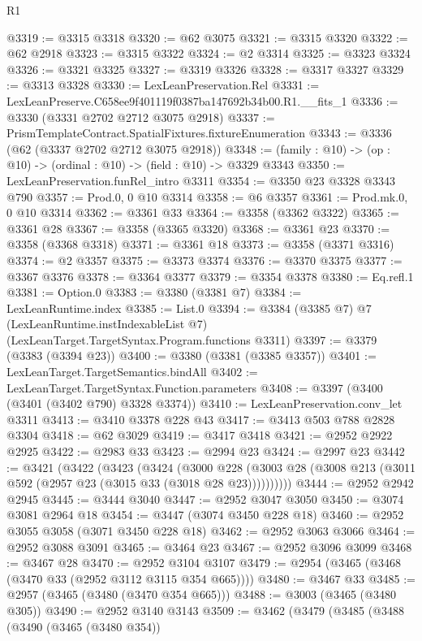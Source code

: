 \begin{lexlean}{R1}
\begin{coremodule}
@3319 := @3315 @3318
@3320 := @62 @3075
@3321 := @3315 @3320
@3322 := @62 @2918
@3323 := @3315 @3322
@3324 := @2 @3314
@3325 := @3323 @3324
@3326 := @3321 @3325
@3327 := @3319 @3326
@3328 := @3317 @3327
@3329 := @3313 @3328
@3330 := LexLeanPreservation.Rel
@3331 := LexLeanPreserve.C658ee9f401119f0387ba147692b34b00.R1.__fits_1
@3336 := @3330 (@3331 @2702 @2712 @3075 @2918)
@3337 := PrismTemplateContract.SpatialFixtures.fixtureEnumeration
@3343 := @3336 (@62 (@3337 @2702 @2712 @3075 @2918))
@3348 := (family : @10) -> (op : @10) -> (ordinal : @10) -> (field : @10) -> @3329 @3343
@3350 := LexLeanPreservation.funRel_intro @3311
@3354 := @3350 @23 @3328 @3343 @790
@3357 := Prod.{0, 0} @10 @3314
@3358 := @6 @3357
@3361 := Prod.mk.{0, 0} @10 @3314
@3362 := @3361 @33
@3364 := @3358 (@3362 @3322)
@3365 := @3361 @28
@3367 := @3358 (@3365 @3320)
@3368 := @3361 @23
@3370 := @3358 (@3368 @3318)
@3371 := @3361 @18
@3373 := @3358 (@3371 @3316)
@3374 := @2 @3357
@3375 := @3373 @3374
@3376 := @3370 @3375
@3377 := @3367 @3376
@3378 := @3364 @3377
@3379 := @3354 @3378
@3380 := Eq.refl.{1}
@3381 := Option.{0}
@3383 := @3380 (@3381 @7)
@3384 := LexLeanRuntime.index
@3385 := List.{0}
@3394 := @3384
    (@3385 @7)
    @7
    (LexLeanRuntime.instIndexableList @7)
    (LexLeanTarget.TargetSyntax.Program.functions @3311)
@3397 := @3379 (@3383 (@3394 @23))
@3400 := @3380 (@3381 (@3385 @3357))
@3401 := LexLeanTarget.TargetSemantics.bindAll
@3402 := LexLeanTarget.TargetSyntax.Function.parameters
@3408 := @3397 (@3400 (@3401 (@3402 @790) @3328 @3374))
@3410 := LexLeanPreservation.conv_let @3311
@3413 := @3410 @3378 @228 @43
@3417 := @3413 @503 @788 @2828 @3304
@3418 := @62 @3029
@3419 := @3417 @3418
@3421 := @2952 @2922 @2925
@3422 := @2983 @33
@3423 := @2994 @23
@3424 := @2997 @23
@3442 := @3421
    (@3422
      (@3423
        (@3424
          (@3000
            @228
            (@3003 @28 (@3008 @213 (@3011 @592 (@2957 @23 (@3015 @33 (@3018 @28 @23))))))))))
@3444 := @2952 @2942 @2945
@3445 := @3444 @3040
@3447 := @2952 @3047 @3050
@3450 := @3074 @3081 @2964 @18
@3454 := @3447 (@3074 @3450 @228 @18)
@3460 := @2952 @3055 @3058 (@3071 @3450 @228 @18)
@3462 := @2952 @3063 @3066
@3464 := @2952 @3088 @3091
@3465 := @3464 @23
@3467 := @2952 @3096 @3099
@3468 := @3467 @28
@3470 := @2952 @3104 @3107
@3479 := @2954 (@3465 (@3468 (@3470 @33 (@2952 @3112 @3115 @354 @665))))
@3480 := @3467 @33
@3485 := @2957 (@3465 (@3480 (@3470 @354 @665)))
@3488 := @3003 (@3465 (@3480 @305))
@3490 := @2952 @3140 @3143
@3509 := @3462
    (@3479
      (@3485
        (@3488
          (@3490
            (@3465 (@3480 @354))

\end{coremodule}
\end{lexlean}

